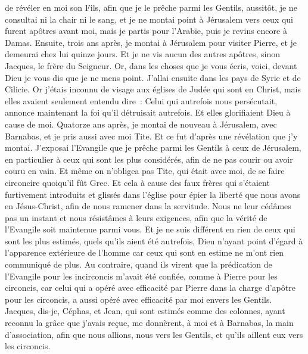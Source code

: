 \begin{multicols}{2}
de révéler en moi son Fils, afin que je le prêche parmi les Gentils, aussitôt, je ne consultai ni la chair ni le sang,
et je ne montai point à Jérusalem vers ceux qui furent apôtres avant moi, mais je partis pour l'Arabie, puis je revins encore à Damas.
Ensuite, trois ans après, je montai à Jérusalem pour visiter Pierre, et je demeurai chez lui quinze jours.
Et je ne vis aucun des autres apôtres, sinon Jacques, le frère du Seigneur.
Or, dans les choses que je vous écris, voici, devant Dieu je vous dis que je ne mens point.
J'allai ensuite dans les pays de Syrie et de Cilicie.
Or j'étais inconnu de visage aux églises de Judée qui sont en Christ,
mais elles avaient seulement entendu dire~: Celui qui autrefois nous persécutait, annonce maintenant la foi qu'il détruisait autrefois.
Et elles glorifiaient Dieu à cause de moi.
\VerseOne{}Quatorze ans après, je montai de nouveau à Jérusalem, avec Barnabas, et je pris aussi avec moi Tite.
Et ce fut d'après une révélation que j'y montai. J'exposai l'Evangile que je prêche parmi les Gentils à ceux de Jérusalem, en particulier à ceux qui sont les plus considérés, afin de ne pas courir ou avoir couru en vain.
Et même on n'obligea pas Tite, qui était avec moi, de se faire circoncire quoiqu'il fût Grec.
Et cela à cause des faux frères qui s'étaient furtivement introduits et glissés dans l'église pour épier la liberté que nous avons en Jésus-Christ, afin de nous ramener dans la servitude.
Nous ne leur cédâmes pas un instant et nous résistâmes à leurs exigences, afin que la vérité de l'Evangile soit maintenue parmi vous.
Et je ne suis différent en rien de ceux qui sont les plus estimés, quels qu'ils aient été autrefois, Dieu n'ayant point d'égard à l'apparence extérieure de l'homme car ceux qui sont en estime ne m'ont rien communiqué de plus.
Au contraire, quand ils virent que la prédication de l'Evangile pour les incirconcis m'avait été confiée, comme à Pierre pour les circoncis,
car celui qui a opéré avec efficacité par Pierre dans la charge d'apôtre pour les circoncis, a aussi opéré avec efficacité par moi envers les Gentils.
Jacques, dis-je, Céphas, et Jean, qui sont estimés comme des colonnes, ayant reconnu la grâce que j'avais reçue, me donnèrent, à moi et à Barnabas, la main d'association, afin que nous allions, nous vers les Gentils, et qu'ils aillent eux vers les circoncis.

\end{multicols}
